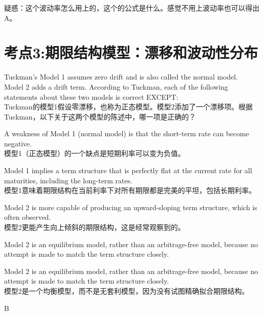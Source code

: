 \documentclass{article}
\newcounter{question} %
\begin{document}
疑惑：这个波动率怎么用上的，这个的公式是什么。感觉不用上波动率也可以得出A。


\section{考点3:期限结构模型：漂移和波动性分布}
\setcounter{question}{0}

\begin{question}
    Tuckman's Model 1 assumes zero drift and is also called the normal model. Model 2 adds a drift term. According to Tuckman, each of the following statements about these two models is correct EXCEPT:
    \\Tuckman的模型1假设零漂移，也称为正态模型。模型2添加了一个漂移项。根据Tuckman，以下关于这两个模型的陈述中，哪一项是正确的？
\end{question}

\begin{choices}
    \item A weakness of Model 1 (normal model) is that the short-term rate can become negative.\\
    模型1（正态模型）的一个缺点是短期利率可以变为负值。
    \item Model 1 implies a term structure that is perfectly flat at the current rate for all maturities, including the long-term rates.\\
    模型1意味着期限结构在当前利率下对所有期限都是完美的平坦，包括长期利率。
    \item Model 2 is more capable of producing an upward-sloping term structure, which is often observed.\\
    模型2更能产生向上倾斜的期限结构，这是经常观察到的。
    \item Model 2 is an equilibrium model, rather than an arbitrage-free model, because no attempt is made to match the term structure closely.
    \item Model 2 is an equilibrium model, rather than an arbitrage-free model, because no attempt is made to match the term structure closely.\\
    模型2是一个均衡模型，而不是无套利模型，因为没有试图精确拟合期限结构。
\end{choices}

\begin{correctanswer}
    B
\end{correctanswer}
\end{document}
